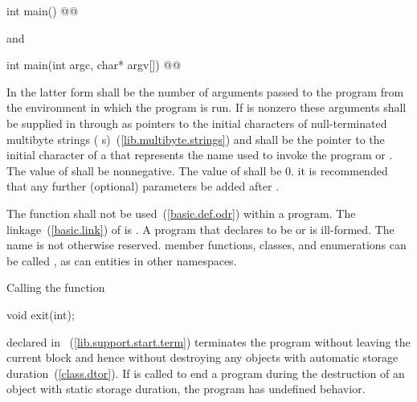 \begin{codeblock}
int main() @@
\end{codeblock}

and

%
%
\begin{codeblock}
int main(int argc, char* argv[]) @@
\end{codeblock}

%
%
In the latter form  shall be the number of arguments passed
to the program from the environment in which the program is run. If
 is nonzero these arguments shall be supplied in
 through  as pointers to the initial
characters of null-terminated multibyte strings (\ntmbs%
s)~(\ref{lib.multibyte.strings}) and  shall be the pointer to
the initial character of a \ntmbs that represents the name used to
invoke the program or . The value of  shall be
nonnegative. The value of  shall be 0. \enternote it
is recommended that any further (optional) parameters be added after
. \exitnote

\pnum
The function  shall not be used~(\ref{basic.def.odr}) within
a program.
%
The linkage~(\ref{basic.link}) of  is
. A program that declares  to be
 or  is ill-formed. The name  is
not otherwise reserved. \enterexample member functions, classes, and
enumerations can be called , as can entities in other
namespaces. \exitexample

\pnum
{}%
%
%
Calling the function

\begin{codeblock}
void exit(int);
\end{codeblock}

declared in ~(\ref{lib.support.start.term}) terminates
the program
without leaving the current block and hence without destroying any
objects with automatic storage duration~(\ref{class.dtor}). If
 is called to end a program during the destruction of
an object with static storage duration, the program has undefined
behavior.

